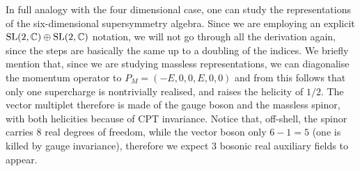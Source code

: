 In full analogy with the four dimensional case, one can study the representations of the six-dimensional supersymmetry algebra. Since we are employing an explicit ${ \text{SL} }(2,\mathbb{C})\oplus { \text{SL} }(2,\mathbb{C})$ notation, we will not go through all the derivation again, since the steps are basically the same up to a doubling of the indices. We briefly mention that, since we are studying massless representations, we can diagonalise the momentum operator to $P_M = (-E, 0, 0, E, 0, 0)$ and from this  follows that only one supercharge is nontrivially realised, and raises the helicity of $1/2$. The vector multiplet therefore is made of the gauge boson and the massless spinor, with both helicities because of CPT invariance. Notice that, off-shell, the spinor carries $8$ real degrees of freedom, while the vector boson only $6-1=5$ (one is killed by gauge invariance), therefore we expect $3$ bosonic real auxiliary fields to appear.




